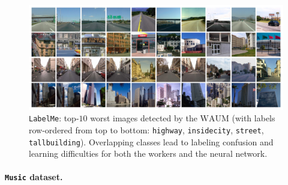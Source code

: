 \begin{figure}[t]
    \centering
    \includegraphics[width=0.9\columnwidth]{images/lowest_labelme_highway_insidecity_street_tallbuilding.pdf}
    \caption{\texttt{LabelMe}: top-$10$ worst images  detected by the $\mathrm{WAUM}$ (with labels row-ordered from top to bottom: \texttt{highway}, \texttt{insidecity}, \texttt{street}, \texttt{tallbuilding}). Overlapping classes lead to labeling confusion and learning difficulties for both the workers and the neural network.}
    \label{fig:worse_labelme}
\end{figure}

\paragraph*{\texttt{Music} dataset.}

